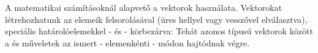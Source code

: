 A matematikai számításoknál alapvető a vektorok használata. Vektorokat létrehozhatunk 
az elemeik felsorolásával (üres hellyel vagy vesszővel elválasztva), 
speciális határolóelemekkel - \mcode{$[$} és \mcode{$]$} - körbezárva:
Tehát azonos típusú vektorok között a \mcode{$+$} és \mcode{$-$} műveletek az 
ismert - elemenkénti - módon hajtódnak végre.
